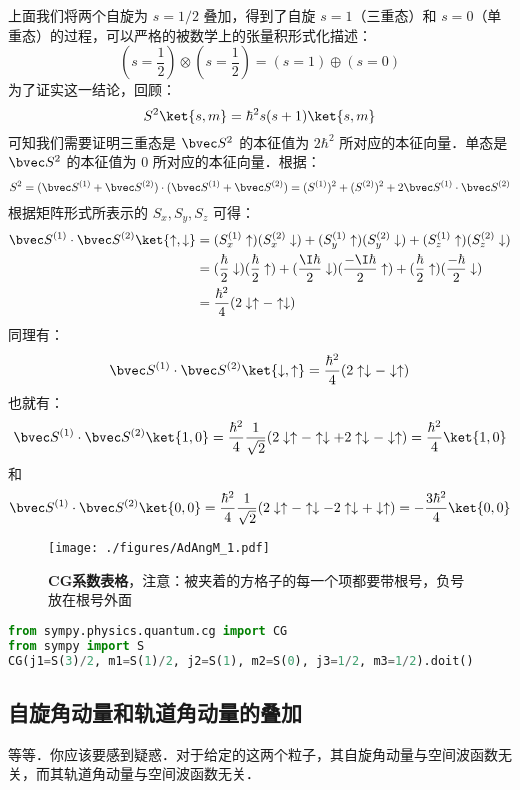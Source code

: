 上面我们将两个自旋为 $s=1/2$ 叠加，得到了自旋 $s=1$（三重态）和 $s=0$（单重态）的过程，可以严格的被数学上的张量积形式化描述：
\begin{equation}
(s=\frac{1}{2})\otimes(s=\frac{1}{2})=(s=1)\oplus (s=0)
\end{equation}
为了证实这一结论，回顾：
\begin{equation}
S^2\ket{s, m} = \hbar^2 s(s+1)\ket{s, m} 
\end{equation}
可知我们需要证明三重态是 $\bvec S^2$ 的本征值为 $2\hbar^2$ 所对应的本征向量．单态是 $\bvec S^2$ 的本征值为 $0$ 所对应的本征向量．根据：
\begin{equation}
S^2=(\bvec S^{(1)}+\bvec S^{(2)})\cdot (\bvec S^{(1)}+\bvec S^{(2)})=( S^{(1)})^2+( S^{(2)})^2+2\bvec S^{(1)}\cdot \bvec S^{(2)}
\end{equation}
根据矩阵形式所表示的 $S_x,S_y,S_z$ 可得：
\begin{align}
\bvec S^{(1)}\cdot \bvec S^{(2)}\ket{\uparrow,\downarrow}&=(S_x^{(1)}\uparrow)(S_x^{(2)}\downarrow)+(S_y^{(1)}\uparrow)(S_y^{(2)}\downarrow)+(S_z^{(1)}\uparrow)(S_z^{(2)}\downarrow)\\
&=(\frac{\hbar}{2}\downarrow)(\frac{\hbar}{2}\uparrow)+(\frac{\I\hbar}{2}\downarrow)(\frac{-\I\hbar}{2}\uparrow)+(\frac{\hbar}{2}\uparrow)(\frac{-\hbar}{2}\downarrow)\\
&=\frac{\hbar^2}{4}(2\downarrow\uparrow-\uparrow\downarrow)
\end{align}
同理有：
\begin{equation}
\bvec S^{(1)}\cdot \bvec S^{(2)}\ket{\downarrow,\uparrow} = \frac{\hbar^2}{4}(2\uparrow\downarrow-\downarrow\uparrow)
\end{equation}
也就有：
\begin{equation}
\bvec S^{(1)}\cdot \bvec S^{(2)}\ket{1,0}=\frac{\hbar^2}{4}\frac{1}{\sqrt{2}}(2\downarrow\uparrow-\uparrow\downarrow+2\uparrow\downarrow-\downarrow\uparrow)=\frac{\hbar^2}{4}\ket{1,0} 
\end{equation}
和
\begin{equation}
\bvec S^{(1)}\cdot \bvec S^{(2)}\ket{0,0}=\frac{\hbar^2}{4}\frac{1}{\sqrt{2}}(2\downarrow\uparrow-\uparrow\downarrow-2\uparrow\downarrow+\downarrow\uparrow)=-\frac{3\hbar^2}{4}\ket{0,0} 
\end{equation}

\begin{figure}[ht]
\centering
\texttt{[image: ./figures/AdAngM\_1.pdf]}
\caption{\textbf{CG系数表格}，注意：被夹着的方格子的每一个项都要带根号，负号放在根号外面} \label{AdAngM_fig1}
\end{figure}
\begin{lstlisting}[language=python]
from sympy.physics.quantum.cg import CG
from sympy import S
CG(j1=S(3)/2, m1=S(1)/2, j2=S(1), m2=S(0), j3=1/2, m3=1/2).doit()
\end{lstlisting}

\subsection{自旋角动量和轨道角动量的叠加}
等等．你应该要感到疑惑．对于给定的这两个粒子，其自旋角动量与空间波函数无关，而其轨道角动量与空间波函数无关．
